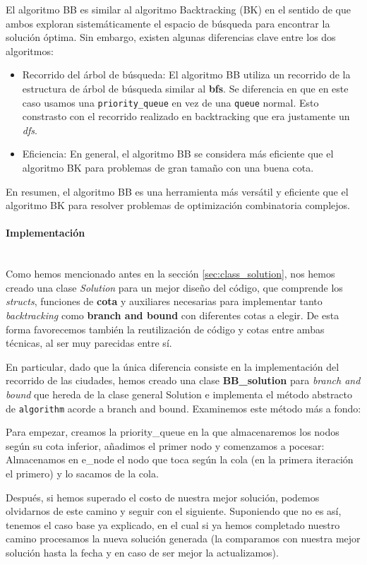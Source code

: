 \documentclass{article}
\newcommand{\myparagraph}[1]{\paragraph{#1}\mbox{}\\}
\begin{document}
El algoritmo BB es similar al algoritmo Backtracking (BK) en el sentido de que ambos exploran sistemáticamente el espacio de búsqueda para encontrar la solución óptima. Sin embargo, existen algunas diferencias clave entre los dos algoritmos:
\begin{itemize}
    \item Recorrido del árbol de búsqueda: El algoritmo BB utiliza un recorrido de la estructura de árbol de búsqueda similar al \textbf{bfs}. Se diferencia en que en este caso usamos una \verb|priority_queue| en vez de una \verb|queue| normal. Esto constrasto con el recorrido realizado en backtracking que era justamente un \textit{dfs}.
    \item Eficiencia: En general, el algoritmo BB se considera más eficiente que el algoritmo BK para problemas de gran tamaño con una buena cota.

\end{itemize}
En resumen, el algoritmo BB es una herramienta más versátil y eficiente que el algoritmo BK para resolver problemas de optimización combinatoria complejos.

\myparagraph{Implementación}



Como hemos mencionado antes en la sección \ref{sec:class_solution}, nos hemos creado una clase \textit{Solution} para un mejor diseño del código,
que comprende los \textit{structs}, funciones de \textbf{cota} y auxiliares
necesarias para implementar tanto \textit{backtracking} como \textbf{branch and bound} con diferentes cotas a elegir. De esta forma favorecemos también la reutilización de código y cotas entre ambas técnicas, al ser muy parecidas entre sí.



En particular, dado que la única diferencia consiste en la implementación del recorrido de las ciudades, hemos creado una clase \textbf{BB\_solution} para \textit{branch and bound} que hereda de la clase general Solution e implementa
el método abstracto de \verb|algorithm| acorde a branch and bound. Examinemos 
este método más a fondo:



Para empezar, creamos la priority\_queue en la que almacenaremos los nodos según su cota inferior, añadimos el primer nodo y comenzamos a pocesar:
Almacenamos en e\_node el nodo que toca según la cola (en la primera iteración el primero) y lo sacamos de la cola.

Después, si hemos superado el costo de nuestra mejor solución, podemos olvidarnos de este camino y seguir con el siguiente.\newline
Suponiendo que no es así, tenemos el caso base ya explicado, en el cual si ya hemos completado nuestro camino procesamos la nueva solución generada (la comparamos con nuestra mejor solución hasta la fecha y en caso de ser mejor la actualizamos).
\end{document}
